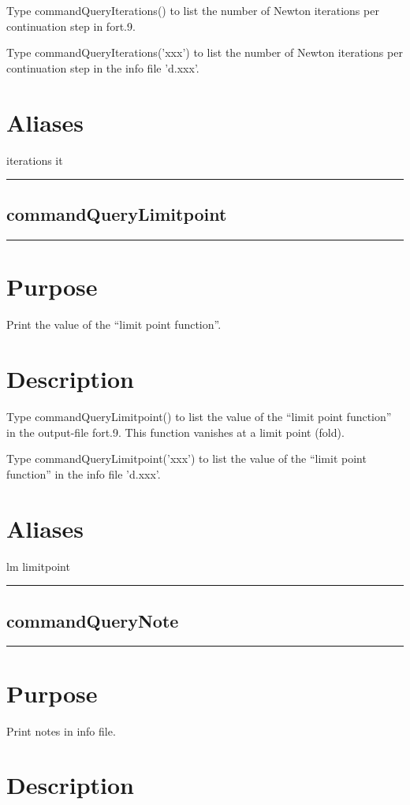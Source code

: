 \documentclass[12pt]{report}
\begin{document}
\begin{minipage}{6in}
    Type commandQueryIterations() to list the number of Newton iterations per
    continuation step in fort.9. 

    Type commandQueryIterations('xxx') to list the number of Newton iterations per
    continuation step in the info file 'd.xxx'.
    \section*{Aliases}
iterations it \medskip\hrule\end{minipage}\subsection{commandQueryLimitpoint} \label{sec:clui_ref_commandQueryLimitpoint}\begin{minipage}{6in}\hrule\medskip\section*{Purpose}
Print the value of the ``limit point function''.\section*{Description}

    Type commandQueryLimitpoint() to list the value of the ``limit point function'' 
    in the output-file fort.9. This function
    vanishes at a limit point (fold).

    Type commandQueryLimitpoint('xxx') to list the value of the ``limit point function'' 
    in the info file 'd.xxx'.
    \section*{Aliases}
lm limitpoint \medskip\hrule\end{minipage}\subsection{commandQueryNote} \label{sec:clui_ref_commandQueryNote}\begin{minipage}{6in}\hrule\medskip\section*{Purpose}
Print notes in info file.\section*{Description}


\end{minipage}
\end{document}
